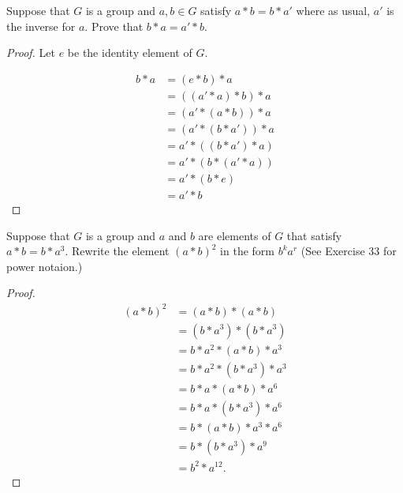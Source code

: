 \begin{exercise}
    Suppose that $G$ is a group and $a, b\in G$ satisfy $a * b = b * a'$ where as usual, $a'$ is the inverse for $a$. Prove that $b * a = a' * b$.
\end{exercise}

\begin{proof}
    Let $e$ be the identity element of $G$.

    \begin{align*}
        b * a & = (e * b) * a         \\
              & = ((a' * a) * b) * a  \\
              & = (a' * (a * b)) * a  \\
              & = (a' * (b * a')) * a \\
              & = a' * ((b * a') * a) \\
              & = a' * (b * (a' * a)) \\
              & = a' * (b * e)        \\
              & = a' * b
    \end{align*}
\end{proof}

\begin{exercise}
    Suppose that $G$ is a group and $a$ and $b$ are elements of $G$ that satisfy $a * b = b * a^{3}$. Rewrite the element ${(a * b)}^{2}$ in the form $b^{k}a^{r}$ (See Exercise 33 for power notaion.)
\end{exercise}

\begin{proof}
    \begin{align*}
        {(a * b)}^{2} & = (a * b) * (a * b)               \\
                      & = (b * a^{3}) * (b * a^{3})       \\
                      & = b * a^{2} * (a * b) * a^{3}     \\
                      & = b * a^{2} * (b * a^{3}) * a^{3} \\
                      & = b * a * (a * b) * a^{6}         \\
                      & = b * a * (b * a^{3}) * a^{6}     \\
                      & = b * (a * b) * a^{3} * a^{6}     \\
                      & = b * (b * a^{3}) * a^{9}         \\
                      & = b^{2} * a^{12}.
    \end{align*}
\end{proof}


